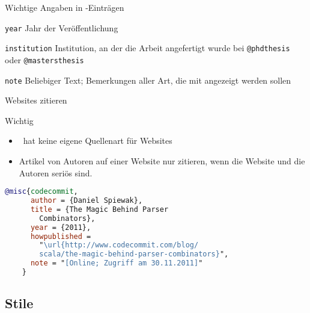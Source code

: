 \begin{Frame}{Wichtige Angaben in \BibTeX-Einträgen}
  \begin{Block}{\lstinline-year-}
    Jahr der Veröffentlichung
  \end{Block}

  \begin{Block}{\lstinline-institution-}
    Institution, an der die Arbeit angefertigt wurde
    bei \lstinline-@phdthesis- oder \lstinline-@mastersthesis-
  \end{Block}

  \begin{Block}{\lstinline-note-}
    Beliebiger Text; Bemerkungen aller Art,
    die mit angezeigt werden sollen
  \end{Block}
\end{Frame}

\begin{Frame}[fragile]{Websites zitieren}
  \begin{alertblock}{Wichtig}
    \begin{itemize}
      \item \BibTeX\ hat \alert{keine eigene Quellenart} für Websites
      \item \alert{Artikel von Autoren} auf einer Website nur zitieren,
        wenn die Website und die \alert{Autoren seriös} sind.
    \end{itemize}
  \end{alertblock}

  \xxx

  \begin{lstlisting}[language=BibTeX,gobble=4,moretexcs={url}]
    @misc{codecommit,
      author = {Daniel Spiewak},
      title = {The Magic Behind Parser
        Combinators},
      year = {2011},
      howpublished =
        "\url{http://www.codecommit.com/blog/
        scala/the-magic-behind-parser-combinators}",
      note = "[Online; Zugriff am 30.11.2011]"
    }
  \end{lstlisting}
\end{Frame}

\subsection{Stile}

